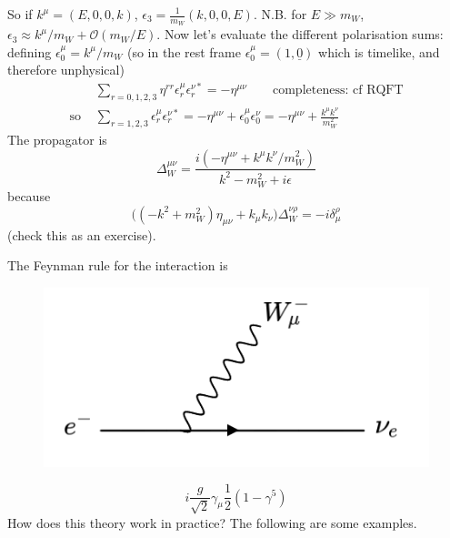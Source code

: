 So if $k^\mu = (E, 0, 0, k)$, $\epsilon_3 = \frac{1}{m_W}(k,0,0,E)$. N.B. for $E \gg m_W$, $\epsilon_3 \approx k^\mu/m_W + \mathcal{O}(m_W/E)$. Now let's evaluate the different polarisation sums: defining $\epsilon_0^\mu = k^\mu/m_W$ (so in the rest frame $\epsilon_0^\mu = (1, \underline{0})$ which is timelike, and therefore unphysical)
\begin{equation}
\begin{split}
&\sum_{r=0,1,2,3}\eta^{rr}\epsilon_r^\mu \epsilon_r^{\nu *} = - \eta^{\mu \nu} \qquad \text{completeness: cf RQFT} \\
\text{so } &\sum_{r=1,2,3}\epsilon^\mu_r \epsilon_r^{\nu *} = -\eta^{\mu \nu} + \epsilon_0^\mu \epsilon_0^\nu = -\eta^{\mu\nu} + \frac{k^\mu k^\nu}{m_W^2}
\end{split}
\end{equation}
The propagator is 
\begin{equation}
\Delta^{\mu\nu}_W = \frac{i(-\eta^{\mu \nu} + k^\mu k^\nu/m_W^2)}{k^2-m_W^2 + i\epsilon}
\end{equation}
because
\begin{equation}
\big((-k^2 + m_W^2)\eta_{\mu\nu} + k_\mu k_\nu)\Delta^{\nu \rho}_W = -i\delta_\mu^\rho
\end{equation}
(check this as an exercise).

The Feynman rule for the interaction is
\newline
\begin{figure}
  \centering
  \includegraphics[width=\linewidth]{figs/17a.png}
\end{figure}
\begin{equation}
i\frac{g}{\sqrt{2}}\gamma_\mu\frac{1}{2}(1-\gamma^5)
\end{equation}
How does this theory work in practice? The following are some examples.
\newline
\newline
